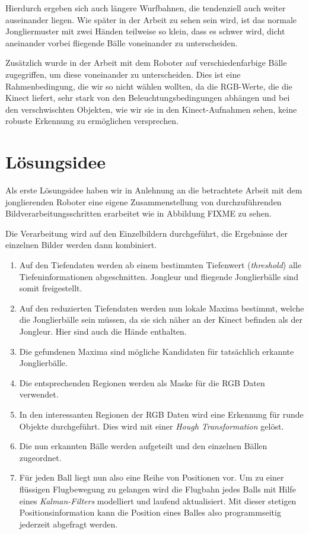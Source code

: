 \documentclass[12pt,a4paper,ngerman]{scrartcl}
\begin{document}
Hierdurch ergeben sich auch längere Wurfbahnen, die tendenziell auch weiter 
auseinander liegen. Wie später in der Arbeit zu sehen sein wird, ist das normale
Jongliermuster mit zwei Händen teilweise so klein, dass es schwer wird, dicht 
aneinander vorbei fliegende Bälle voneinander zu unterscheiden.

Zusätzlich wurde in der Arbeit mit dem Roboter auf verschiedenfarbige Bälle 
zugegriffen, um diese voneinander zu unterscheiden. Dies ist eine Rahmenbedingung,
die wir so nicht wählen wollten, da die RGB-Werte, die die Kinect liefert, sehr stark 
von den Beleuchtungsbedingungen abhängen und bei den verschwischten Objekten, wie
wir sie in den Kinect-Aufnahmen sehen, keine robuste Erkennung zu ermöglichen 
versprechen.


\section{Lösungsidee}

Als erste Lösungsidee haben wir in Anlehnung an die betrachtete Arbeit mit dem 
jonglierenden Roboter eine eigene Zusammenstellung von durchzuführenden Bildverarbeitungsschritten erarbeitet wie in Abbildung FIXME zu sehen.

Die Verarbeitung wird auf den Einzelbildern durchgeführt, die Ergebnisse der 
einzelnen Bilder werden dann kombiniert.  

\begin{enumerate}
\item Auf den Tiefendaten werden ab einem bestimmten Tiefenwert (\textit{threshold}) 
	alle Tiefeninformationen abgeschnitten. Jongleur und fliegende Jonglierbälle sind
	somit freigestellt.
\item Auf den reduzierten Tiefendaten werden nun lokale Maxima bestimmt, welche die 
	Jonglierbälle sein müssen, da sie sich näher an der Kinect befinden als der 
	Jongleur. Hier sind auch die Hände enthalten.
\item Die gefundenen Maxima sind mögliche Kandidaten für tatsächlich erkannte 
	Jonglierbälle. 
\item Die entsprechenden Regionen werden als Maske für die RGB Daten verwendet.
\item In den interessanten Regionen der RGB Daten wird eine Erkennung für runde 
	Objekte durchgeführt. Dies wird mit einer \textit{Hough Transformation} gelöst.
\item Die nun erkannten Bälle werden aufgeteilt und den einzelnen Bällen zugeordnet.
\item Für jeden Ball liegt nun also eine Reihe von Positionen vor. Um zu einer 
	flüssigen Flugbewegung zu gelangen wird die Flugbahn jedes Balls mit Hilfe eines
	\textit{Kalman-Filters} modelliert und laufend aktualisiert. Mit dieser stetigen
	Positionsinformation kann die Position eines Balles also programmseitig jederzeit 
	abgefragt werden.
\end{enumerate}
\end{document}
